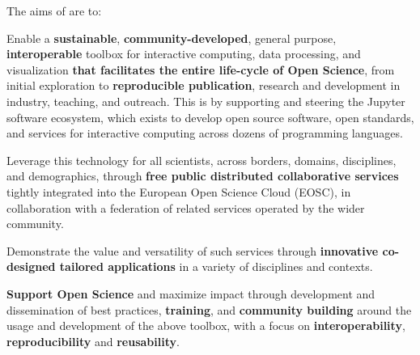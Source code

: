 \medskip
\noindent The aims of \TheProject are to:

\begin{compactenum}
\item Enable a
  \textbf{sustainable}, \textbf{community-developed}, general purpose, \textbf{interoperable} toolbox for
  interactive computing, data processing, and visualization
  \textbf{that facilitates the entire life-cycle of Open Science},
  from initial exploration to \textbf{reproducible publication}, research and development in
  industry, teaching, and outreach.
  This is by supporting and steering the Jupyter software ecosystem,
  which exists to develop open source software,
  open standards, and services for interactive computing across dozens of programming languages.

\item Leverage this technology for all scientists, across borders,
  domains, disciplines, and demographics, through
  \textbf{free public distributed collaborative services} tightly integrated
  into the European Open Science Cloud (EOSC),
  in collaboration with a federation of related services
  operated by the wider community.

\item Demonstrate the value and versatility of such services through
  \textbf{innovative co-designed tailored applications} in a variety of disciplines and
  contexts.

\item \textbf{Support Open Science} and maximize impact through development and
  dissemination of best practices,
  \textbf{training}, and \textbf{community building}
  around the usage and development of the above toolbox,
  with a focus on \textbf{interoperability}, \textbf{reproducibility}
  and \textbf{reusability}.
\end{compactenum}


